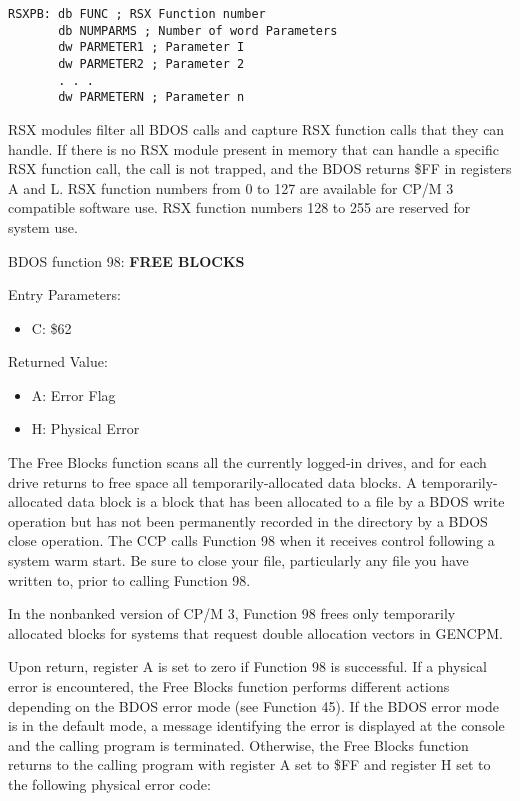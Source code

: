 \begin{verbatim}
RSXPB: db FUNC ; RSX Function number
       db NUMPARMS ; Number of word Parameters
       dw PARMETER1 ; Parameter I
       dw PARMETER2 ; Parameter 2
       . . .
       dw PARMETERN ; Parameter n
\end{verbatim}

RSX modules filter all BDOS calls and capture RSX function calls that
they can handle. If there is no RSX module present in memory that can
handle a specific RSX function call, the call is not trapped, and the
BDOS returns \$FF in registers A and L. RSX function numbers from 0 to
127 are available for CP/M 3 compatible software use. RSX function
numbers 128 to 255 are reserved for system use.

BDOS function 98: \textbf{FREE BLOCKS}

Entry Parameters:
\begin{itemize}
\item[] C: \$62
\end{itemize}

Returned Value:
\begin{itemize}
\item[] A: Error Flag
\item[] H: Physical Error
\end{itemize}

The Free Blocks function scans all the currently logged-in drives, and
for each drive returns to free space all temporarily-allocated data
blocks. A temporarily-allocated data block is a block that has been
allocated to a file by a BDOS write operation but has not been
permanently recorded in the directory by a BDOS close operation. The
CCP calls Function 98 when it receives control following a system warm
start. Be sure to close your file, particularly any file you have
written to, prior to calling Function 98.

In the nonbanked version of CP/M 3, Function 98 frees only temporarily
allocated blocks for systems that request double allocation vectors in
GENCPM.

Upon return, register A is set to zero if Function 98 is
successful. If a physical error is encountered, the Free Blocks
function performs different actions depending on the BDOS error mode
(see Function 45). If the BDOS error mode is in the default mode, a
message identifying the error is displayed at the console and the
calling program is terminated. Otherwise, the Free Blocks function
returns to the calling program with register A set to \$FF and
register H set to the following physical error code:

